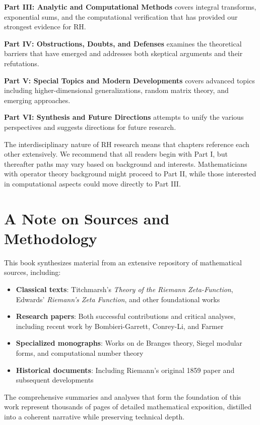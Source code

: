\textbf{Part III: Analytic and Computational Methods} covers integral transforms, exponential sums, and the computational verification that has provided our strongest evidence for RH.

\textbf{Part IV: Obstructions, Doubts, and Defenses} examines the theoretical barriers that have emerged and addresses both skeptical arguments and their refutations.

\textbf{Part V: Special Topics and Modern Developments} covers advanced topics including higher-dimensional generalizations, random matrix theory, and emerging approaches.

\textbf{Part VI: Synthesis and Future Directions} attempts to unify the various perspectives and suggests directions for future research.

The interdisciplinary nature of RH research means that chapters reference each other extensively. We recommend that all readers begin with Part I, but thereafter paths may vary based on background and interests. Mathematicians with operator theory background might proceed to Part II, while those interested in computational aspects could move directly to Part III.

\section*{A Note on Sources and Methodology}

This book synthesizes material from an extensive repository of mathematical sources, including:

\begin{itemize}
\item \textbf{Classical texts}: Titchmarsh's \emph{Theory of the Riemann Zeta-Function}, Edwards' \emph{Riemann's Zeta Function}, and other foundational works
\item \textbf{Research papers}: Both successful contributions and critical analyses, including recent work by Bombieri-Garrett, Conrey-Li, and Farmer
\item \textbf{Specialized monographs}: Works on de Branges theory, Siegel modular forms, and computational number theory
\item \textbf{Historical documents}: Including Riemann's original 1859 paper and subsequent developments
\end{itemize}

The comprehensive summaries and analyses that form the foundation of this work represent thousands of pages of detailed mathematical exposition, distilled into a coherent narrative while preserving technical depth.

